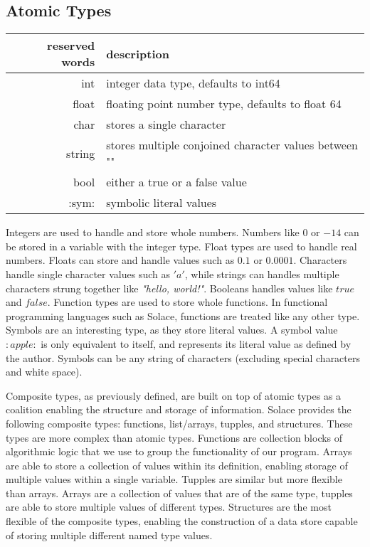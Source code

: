 \documentclass{article}
\begin{document}
\subsection{Atomic Types}
\begin{center}
\begin{tabular}{|r|l|}
	\hline
	reserved words & description \\
	\hline
	\hline
	int & integer data type, defaults to int64 \\
	float & floating point number type, defaults to float 64 \\
	char & stores a single character \\
	string & stores multiple conjoined character values between "" \\
	bool & either a true or a false value \\
	:sym: & symbolic literal values \\
	\hline
\end{tabular}
\end{center}

Integers are used to handle and store whole numbers. Numbers like $0$ or $-14$ can be stored in a variable with the integer type. Float
types are used to handle real numbers. Floats can store and handle values such as $0.1$ or $0.0001$. Characters handle single character
values such as $'a'$, while strings can handles multiple characters strung together like \textit{"hello, world!"}. Booleans handles values like
$true$ and $false$. Function types are used to store whole functions. In functional programming languages such as Solace, functions are
treated like any other type. Symbols are an interesting type, as they store literal values. A symbol value $:apple:$ is only equivalent
to itself, and represents its literal value as defined by the author. Symbols can be any string of characters (excluding special
characters and white space).

Composite types, as previously defined, are built on top of atomic types as a coalition enabling the structure and storage of
information. Solace provides the following composite types: functions, list/arrays, tupples, and structures. These types are more complex than
atomic types. Functions are collection blocks of algorithmic logic that we use to group the functionality of our program.
Arrays are able to store a collection of values within its definition, enabling storage of multiple values within a single
variable. Tupples are similar but more flexible than arrays. Arrays are a collection of values that are of the same type, tupples are able
to store multiple values of different types. Structures are the most flexible of the composite types, enabling the construction of a data
store capable of storing multiple different named type values.
\end{document}
